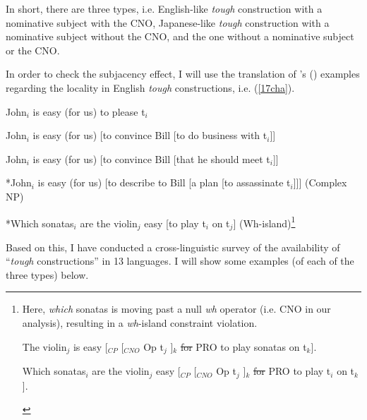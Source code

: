 \documentclass[output=paper,colorlinks,citecolor=brown,
]{langscibook}
\begin{document}
In short, there are three types, i.e. English-like \textit{tough} construction with a nominative subject with the CNO, Japanese-like \textit{tough} construction with a nominative subject without the CNO, and the one without a nominative subject or the CNO. 

In order to check the subjacency effect, I will use the translation of \citeauthor{Chomsky1977}’s (\citeyear{Chomsky1977}) examples regarding the locality in English \textit{tough} constructions, i.e. (\ref{17cha}).

\begin{exe}
\ex \label{17ha}
\begin{xlist}
\ex \label{17aha}
John$_{i}$ is easy (for us) to please t$_{i}$

\ex \label{17bha}
\begin{xlist}
\ex \label{17biha}
John$_{i}$ is easy (for us) [to convince Bill [to do business with t$_{i}$]]

\ex \label{17biiha}
John$_{i}$ is easy (for us) [to convince Bill [that he should meet t$_{i}$]]

\end{xlist}
\ex \label{17cha}
\begin{xlist}
\ex \label{17ciha}
*John$_{i}$ is easy (for us) [to describe to Bill [a plan [to assassinate t$_{i}$]]]    \hfill (Complex NP)

\ex \label{17ciiha}
*Which sonatas$_{i}$ are the violin$_{j}$ easy [to play t$_{i}$ on t$_{j}$] \hfill (Wh-island)\footnote{Here, \textit{which} sonatas is moving past a null \textit{wh} operator (i.e. CNO in our analysis), resulting in a \textit{wh}-island constraint violation.
\begin{exe}
\ex 
\begin{xlist}
\ex 
The violin$_{j}$ is easy [$_{CP}$ [$_{CNO}$ Op t$_{j}$ ]$_{k}$ \sout{for} PRO to play sonatas on t$_{k}$].

\ex *Which sonatas$_{i}$ are the violin$_{j}$ easy [$_{CP}$ [$_{CNO}$ Op t$_{j}$ ]$_{k}$ \sout{for} PRO to play t$_{i}$ on t$_{k}$].
\end{xlist}
\end{exe}
} 
\end{xlist}

\end{xlist}
\end{exe}

Based on this, I have conducted a cross-linguistic survey of the availability of “\textit{tough} constructions” in 13 languages. I will show some examples (of each of the three types) below.
\end{document}
